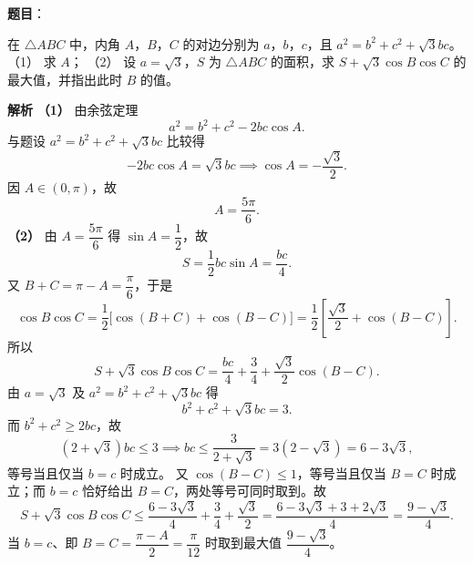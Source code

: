 \begin{answer}

\textbf{题目}：

在 $\triangle ABC$ 中，内角 $A$，$B$，$C$ 的对边分别为 $a$，$b$，$c$，且 $a^2=b^2+c^2+\sqrt3bc$。
（1） 求 $A$；
（2） 设 $a=\sqrt3$，$S$ 为 $\triangle ABC$ 的面积，求 $S+\sqrt3\cos B\cos C$ 的最大值，并指出此时 $B$ 的值。

\textbf{解析}
\textbf{（1）} 由余弦定理
\nopagebreak[4]
\[a^2=b^2+c^2-2bc\cos A.\]
与题设 $a^2=b^2+c^2+\sqrt3bc$ 比较得
\nopagebreak[4]
\[-2bc\cos A=\sqrt3bc\implies\cos A=-\frac{\sqrt3}2.\]
因 $A\in(0,\pi)$，故
\nopagebreak[4]
\[A=\frac{5\pi}6.\]
\textbf{（2）} 由 $A=\dfrac{5\pi}6$ 得 $\sin A=\dfrac12$，故
\nopagebreak[4]
\[S=\frac12bc\sin A=\frac{bc}4.\]
又 $B+C=\pi-A=\dfrac\pi6$，于是
\nopagebreak[4]
\[\cos B\cos C=\frac12\big[\cos(B+C)+\cos(B-C)\big]=\frac12\left[\frac{\sqrt3}2+\cos(B-C)\right].\]
所以
\nopagebreak[4]
\[S+\sqrt3\cos B\cos C=\frac{bc}4+\frac34+\frac{\sqrt3}2\cos(B-C).\]
由 $a=\sqrt3$ 及 $a^2=b^2+c^2+\sqrt3bc$ 得
\nopagebreak[4]
\[b^2+c^2+\sqrt3bc=3.\]
而 $b^2+c^2\geqslant2bc$，故
\nopagebreak[4]
\[(2+\sqrt3)bc\leqslant3\implies bc\leqslant\frac3{2+\sqrt3}=3(2-\sqrt3)=6-3\sqrt3,\]
等号当且仅当 $b=c$ 时成立。
又 $\cos(B-C)\leqslant1$，等号当且仅当 $B=C$ 时成立；而 $b=c$ 恰好给出 $B=C$，两处等号可同时取到。故
\nopagebreak[4]
\[S+\sqrt3\cos B\cos C\leqslant\frac{6-3\sqrt3}4+\frac34+\frac{\sqrt3}2=\frac{6-3\sqrt3+3+2\sqrt3}4=\frac{9-\sqrt3}4.\]
当 $b=c$、即 $B=C=\dfrac{\pi-A}2=\dfrac\pi{12}$ 时取到最大值 $\dfrac{9-\sqrt3}4$。



\end{answer}
